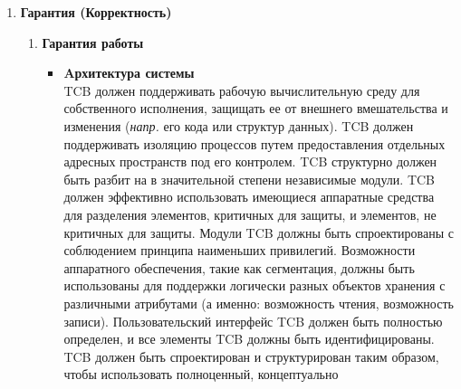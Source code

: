 \begin{enumerate}
\begin{enumerate}
\begin{enumerate}
\begin{enumerate}
                вводящих объект в адресное пространство пользователя и удаляющих объект, запись в журнале аудита должна содержать имя объекта и его уровень конфиденциальности. Администратор
                системы должен иметь возможность выборочного аудита действия любого одного или нескольких пользователей системы на основе индивидуальной идентификации и/или уровне конфиденциальности объекта.
                TCB должен иметь возможность аудита событий для выявления использования скрытых каналов связи. TCB должен содержать механизм, способный отслеживать возникновение или накопление
                проверяемых событий безопасности, которые могут указывать на предполагаемое нарушение политики безопасности. Этот механизм должен немедленно уведомить администратора безопасности
                о превышении пороговых значений, и если возникновение или накопление этих событий, имеющих отношение к безопасности, продолжается, система должна предпринять наименее
                разрушительное действие для прекращения возникновения событий.
            \end{enumerate}
            \item{\textbf{Гарантия (Корректность)}}
            \begin{enumerate}
            \item{\textbf{Гарантия работы}}
                \begin{itemize}
                    \item{\textbf{Aрхитектура системы}}\\
                    TCB должен поддерживать рабочую вычислительную среду для собственного исполнения, защищать ее от внешнего вмешательства и изменения  (\textit{напр.} его кода или структур данных).
                    TCB должен поддерживать изоляцию процессов путем предоставления отдельных адресных пространств под его контролем. TCB структурно должен быть разбит на в значительной степени
                    независимые модули. TCB должен эффективно использовать имеющиеся аппаратные средства для разделения элементов, критичных для защиты, и элементов, не критичных для защиты.
                    Модули TCB должны быть спроектированы с соблюдением принципа наименьших привилегий. Возможности аппаратного обеспечения, такие как сегментация, должны быть использованы
                    для поддержки логически разных объектов хранения с различными атрибутами (а именно: возможность чтения, возможность записи). Пользовательский интерфейс TCB должен быть полностью
                    определен, и все элементы TCB должны быть идентифицированы. TCB должен быть спроектирован и структурирован таким образом, чтобы использовать полноценный, концептуально

\end{itemize}
\end{enumerate}
\end{enumerate}
\end{enumerate}
\end{enumerate}
